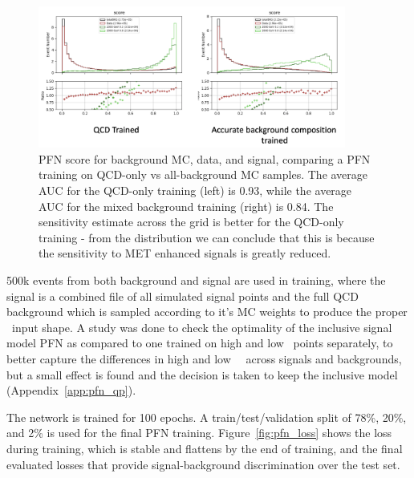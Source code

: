 \begin{figure}[!htbp]
\centering
   \includegraphics[width=0.9\textwidth]{figures/ml/pfn_MC_training_mixture}
    \caption{PFN score for background MC, data, and signal, comparing a PFN training on QCD-only vs all-background MC samples. The average AUC for the QCD-only training (left) is 0.93, while the average AUC for the mixed background training (right) is 0.84. The sensitivity estimate across the grid is better for the QCD-only training - from the distribution we can conclude that this is because the sensitivity to MET enhanced signals is greatly reduced.
    \label{fig:fn_MC_training_mixture}}
\end{figure}

500k events from both background and signal are used in training, where the signal is a combined file of all simulated signal points and the full QCD background which is sampled according to it's MC weights to produce the proper \pt~input shape. A study was done to check the optimality of the inclusive signal model PFN as compared to one trained on high and low \rinv~points separately, to better capture the differences in high and low~\met~ across signals and backgrounds, but a small effect is found and the decision is taken to keep the inclusive model (Appendix~\ref{app:pfn_qp}).\par

The network is trained for 100 epochs. A train/test/validation split of 78\%, 20\%, and 2\% is used for the final PFN training. Figure~\ref{fig:pfn_loss} shows the loss during training, which is stable and flattens by the end of training, and the final evaluated losses that provide signal-background discrimination over the test set.

